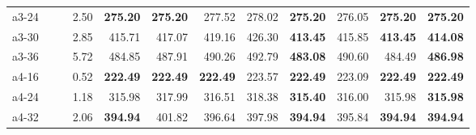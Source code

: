 \documentclass[aspectratio=1610]{beamer}
\begin{document}
\begin{frame}
\begin{table}[]
{\begin{tabular}{lrrrrrrrrrrr}
a3-24                                          &              & \multicolumn{1}{r|}{}                                       & 2.50              & \textbf{275.20} & \multicolumn{1}{r|}{{\color[HTML]{FE0000} \textbf{275.20}}} & 277.52          & \multicolumn{1}{r|}{278.02}   & \textbf{275.20} & \multicolumn{1}{r|}{276.05}                                 & \textbf{275.20} & {\color[HTML]{FE0000} \textbf{275.20}} \\
a3-30                                          &              & \multicolumn{1}{r|}{}                                       & 2.85              & 415.71          & \multicolumn{1}{r|}{417.07}                                 & 419.16          & \multicolumn{1}{r|}{426.30}   & \textbf{413.45} & \multicolumn{1}{r|}{415.85}                                 & \textbf{413.45} & {\color[HTML]{FE0000} \textbf{414.08}} \\
a3-36                                          &              & \multicolumn{1}{r|}{}                                       & 5.72              & 484.85          & \multicolumn{1}{r|}{487.91}                                 & 490.26          & \multicolumn{1}{r|}{492.79}   & \textbf{483.08} & \multicolumn{1}{r|}{490.60}                                 & 484.49          & {\color[HTML]{FE0000} \textbf{486.98}} \\
a4-16                                          &              & \multicolumn{1}{r|}{}                                       & 0.52              & \textbf{222.49} & \multicolumn{1}{r|}{{\color[HTML]{FE0000} \textbf{222.49}}} & \textbf{222.49} & \multicolumn{1}{r|}{223.57}   & \textbf{222.49} & \multicolumn{1}{r|}{223.09}                                 & \textbf{222.49} & {\color[HTML]{FE0000} \textbf{222.49}} \\
a4-24                                          &              & \multicolumn{1}{r|}{}                                       & 1.18              & 315.98          & \multicolumn{1}{r|}{317.99}                                 & 316.51          & \multicolumn{1}{r|}{318.38}   & \textbf{315.40} & \multicolumn{1}{r|}{316.00}                                 & 315.98          & {\color[HTML]{FE0000} \textbf{315.98}} \\
a4-32                                          &              & \multicolumn{1}{r|}{}                                       & 2.06              & \textbf{394.94} & \multicolumn{1}{r|}{401.82}                                 & 396.64          & \multicolumn{1}{r|}{397.98}   & \textbf{394.94} & \multicolumn{1}{r|}{395.84}                                 & \textbf{394.94} & {\color[HTML]{FE0000} \textbf{394.94}} \\

\end{tabular}}
\end{table}
\end{frame}
\end{document}
